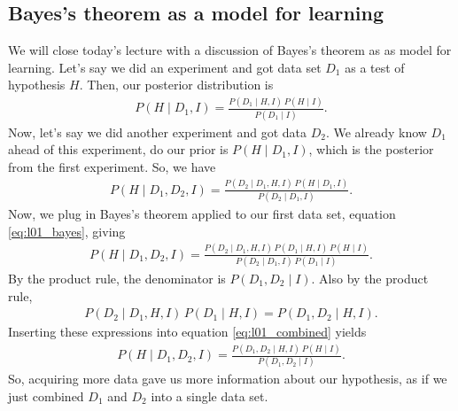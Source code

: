 \subsection{Bayes's theorem as a model for learning}
\label{sec:l01_learning}
We will close today's lecture with a discussion of Bayes's theorem as
as model for learning.  Let's say we did an experiment and got data
set $D_1$ as a test of hypothesis $H$.  Then, our posterior
distribution is
\begin{align}
P(H\mid D_1, I) = \frac{P(D_1 \mid H, I)\, P(H \mid I)}{P(D_1 \mid I)}.
\label{eq:l01_bayes}
\end{align}
Now, let's say we did another experiment and got data $D_2$.  We
already know $D_1$ ahead of this experiment, do our prior is
$P(H\mid D_1, I)$, which is the posterior from the first experiment.
So, we have
\begin{align}
  P(H\mid D_1, D_2, I) = \frac{P(D_2 \mid D_1, H, I)\, P(H \mid D_1, I)}{P(D_2 \mid D_1, I)}.
\end{align}
Now, we plug in Bayes's theorem applied to our first data set,
equation \eqref{eq:l01_bayes}, giving
\begin{align}
P(H\mid D_1, D_2, I) = \frac{P(D_2 \mid D_1, H, I)\,P(D_1 \mid H, I)\, P(H \mid I)}{P(D_2 \mid D_1, I)\, P(D_1 \mid I)}.
\label{eq:l01_combined}
\end{align}
By the product rule, the denominator is $P(D_1, D_2 \mid I)$.  Also by
the product rule,
\begin{align}
P(D_2 \mid D_1, H, I)\,P(D_1 \mid H, I) = P(D_1, D_2 \mid H, I).
\end{align}
Inserting these expressions into equation \eqref{eq:l01_combined}
yields
\begin{align}
  P(H\mid D_1, D_2, I) = \frac{P(D_1, D_2 \mid H, I)\,P(H\mid I)}{P(D_1, D_2 \mid I)}.
\end{align}
So, acquiring more data gave us more information about our hypothesis,
as if we just combined $D_1$ and $D_2$ into a single data set.

